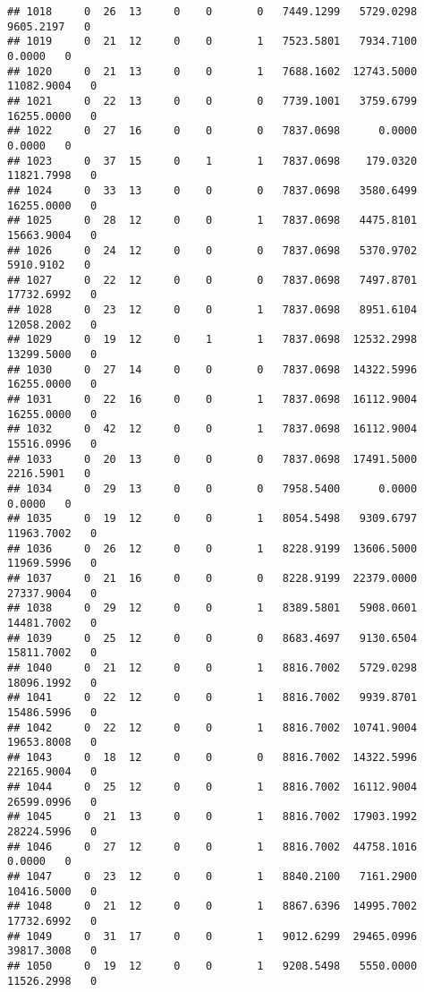 \documentclass[
]{article}
\begin{document}
\begin{enumerate}
\begin{verbatim}
## 1018     0  26  13     0    0       0   7449.1299   5729.0298   9605.2197   0
## 1019     0  21  12     0    0       1   7523.5801   7934.7100      0.0000   0
## 1020     0  21  13     0    0       1   7688.1602  12743.5000  11082.9004   0
## 1021     0  22  13     0    0       0   7739.1001   3759.6799  16255.0000   0
## 1022     0  27  16     0    0       0   7837.0698      0.0000      0.0000   0
## 1023     0  37  15     0    1       1   7837.0698    179.0320  11821.7998   0
## 1024     0  33  13     0    0       0   7837.0698   3580.6499  16255.0000   0
## 1025     0  28  12     0    0       1   7837.0698   4475.8101  15663.9004   0
## 1026     0  24  12     0    0       0   7837.0698   5370.9702   5910.9102   0
## 1027     0  22  12     0    0       0   7837.0698   7497.8701  17732.6992   0
## 1028     0  23  12     0    0       1   7837.0698   8951.6104  12058.2002   0
## 1029     0  19  12     0    1       1   7837.0698  12532.2998  13299.5000   0
## 1030     0  27  14     0    0       0   7837.0698  14322.5996  16255.0000   0
## 1031     0  22  16     0    0       1   7837.0698  16112.9004  16255.0000   0
## 1032     0  42  12     0    0       1   7837.0698  16112.9004  15516.0996   0
## 1033     0  20  13     0    0       0   7837.0698  17491.5000   2216.5901   0
## 1034     0  29  13     0    0       0   7958.5400      0.0000      0.0000   0
## 1035     0  19  12     0    0       1   8054.5498   9309.6797  11963.7002   0
## 1036     0  26  12     0    0       1   8228.9199  13606.5000  11969.5996   0
## 1037     0  21  16     0    0       0   8228.9199  22379.0000  27337.9004   0
## 1038     0  29  12     0    0       1   8389.5801   5908.0601  14481.7002   0
## 1039     0  25  12     0    0       0   8683.4697   9130.6504  15811.7002   0
## 1040     0  21  12     0    0       1   8816.7002   5729.0298  18096.1992   0
## 1041     0  22  12     0    0       1   8816.7002   9939.8701  15486.5996   0
## 1042     0  22  12     0    0       1   8816.7002  10741.9004  19653.8008   0
## 1043     0  18  12     0    0       0   8816.7002  14322.5996  22165.9004   0
## 1044     0  25  12     0    0       1   8816.7002  16112.9004  26599.0996   0
## 1045     0  21  13     0    0       1   8816.7002  17903.1992  28224.5996   0
## 1046     0  27  12     0    0       1   8816.7002  44758.1016      0.0000   0
## 1047     0  23  12     0    0       1   8840.2100   7161.2900  10416.5000   0
## 1048     0  21  12     0    0       1   8867.6396  14995.7002  17732.6992   0
## 1049     0  31  17     0    0       1   9012.6299  29465.0996  39817.3008   0
## 1050     0  19  12     0    0       1   9208.5498   5550.0000  11526.2998   0

\end{verbatim}
\end{enumerate}
\end{document}
